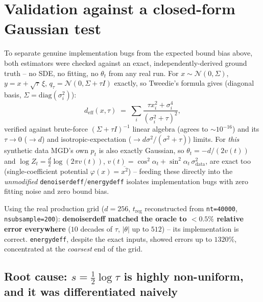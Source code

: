 \documentclass[11pt]{article}
\newcommand{\code}[1]{\texttt{#1}}
\renewcommand{\_}{\origunderscore\allowbreak}
\newcommand{\deff}{d_{\mathrm{eff}}}
\begin{document}
\section{Validation against a closed-form Gaussian test}
\label{sec:gaussian-test}

To separate genuine implementation bugs from the expected bound bias above,
both estimators were checked against an exact, independently-derived ground
truth -- no SDE, no fitting, no $\theta_t$ from any real run. For
$x\sim\mathcal N(0,\Sigma)$, $y=x+\sqrt\tau\,\xi$, $q_\tau=\mathcal
N(0,\Sigma+\tau I)$ exactly, so Tweedie's formula gives (diagonal basis,
$\Sigma=\mathrm{diag}(\sigma_i^2)$):
\begin{equation}
  \deff(x,\tau) \;=\; \sum_i \frac{\tau x_i^2 + \sigma_i^4}{(\sigma_i^2+\tau)^2},
  \label{eq:gaussian-oracle}
\end{equation}
verified against brute-force $(\Sigma+\tau I)^{-1}$ linear algebra (agrees
to $\sim 10^{-16}$) and its $\tau\to0$ ($\to d$) and isotropic-expectation
($\to d\sigma^2/(\sigma^2+\tau)$) limits. For \emph{this} synthetic data MGD's
own $p_t$ is also exactly Gaussian, so $\theta_t=-d/(2v(t))$ and $\log
Z_t=\tfrac{d}{2}\log(2\pi v(t))$, $v(t)=\cos^2\alpha_t+\sin^2\alpha_t\,
\sigma_{\mathrm{data}}^2$, are exact too (single-coefficient potential
$\varphi(x)=\overline{x^2}$) -- feeding these directly into the
\emph{unmodified} \code{denoiser\_d\_eff}/\code{energy\_d\_eff} isolates
implementation bugs with zero fitting noise and zero bound bias.

Using the real production grid ($d{=}256$, $t_{\mathrm{reg}}$ reconstructed
from \code{nt=40000}, \code{n\_subsample=200}): \textbf{denoiser\_d\_eff
matched the oracle to $<0.5\%$ relative error everywhere} ($10$ decades of
$\tau$, $|\theta|$ up to $512$) -- its implementation is correct.
\code{energy\_d\_eff}, despite the exact inputs, showed errors up to
$1320\%$, concentrated at the \emph{coarsest} end of the grid.

\subsection{Root cause: $s=\tfrac12\log\tau$ is highly non-uniform, and it
was differentiated naively}
\end{document}
